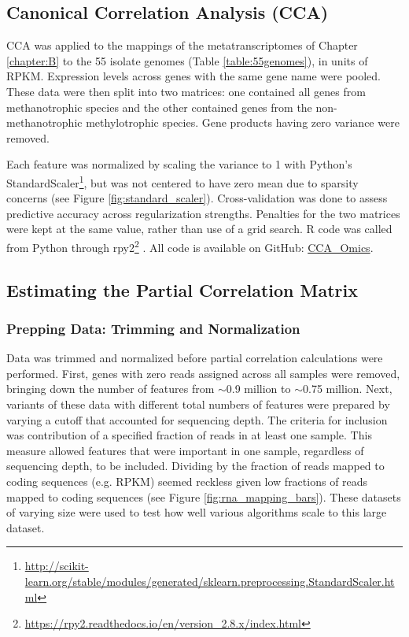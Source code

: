 \subsection{Canonical Correlation Analysis (CCA)}
CCA was applied to the mappings of the metatranscriptomes of Chapter \ref{chapter:B} to the 55 isolate genomes (Table \ref{table:55genomes}), in units of RPKM.
Expression levels across genes with the same gene name were pooled.
These data were then split into two matrices: one contained all genes from methanotrophic species and the other contained genes from the non-methanotrophic methylotrophic species.
Gene products having zero variance were removed.

Each feature was normalized by scaling the variance to 1 with Python's StandardScaler\footnote{\url{http://scikit-learn.org/stable/modules/generated/sklearn.preprocessing.StandardScaler.html}}, but was not centered to have zero mean due to sparsity concerns (see Figure \ref{fig:standard_scaler}).
Cross-validation was done to assess predictive accuracy across regularization strengths.
Penalties for the two matrices were kept at the same value, rather than use of a grid search.  %
R code was called from Python through rpy2\footnote{\url{https://rpy2.readthedocs.io/en/version_2.8.x/index.html}} \cite{gautier2008}.
All code is available on GitHub: \href{https://github.com/JanetMatsen/CCA_Omics}{CCA\_Omics}.

\subsection{Estimating the Partial Correlation Matrix}

\subsubsection{Prepping Data: Trimming and Normalization}
Data was trimmed and normalized before partial correlation calculations were performed.
First, genes with zero reads assigned across all samples were removed, bringing down the number of features from $\sim$0.9 million to $\sim$0.75 million. %
Next, variants of these data with different total numbers of features were prepared by varying a cutoff that accounted for sequencing depth.
The criteria for inclusion was contribution of a specified fraction of reads in at least one sample.
This measure allowed features that were important in one sample, regardless of sequencing depth, to be included.
Dividing by the fraction of reads mapped to coding sequences (e.g. RPKM) seemed reckless given low fractions of reads mapped to coding sequences (see Figure \ref{fig:rna_mapping_bars}).
These datasets of varying size were used to test how well various algorithms scale to this large dataset.

